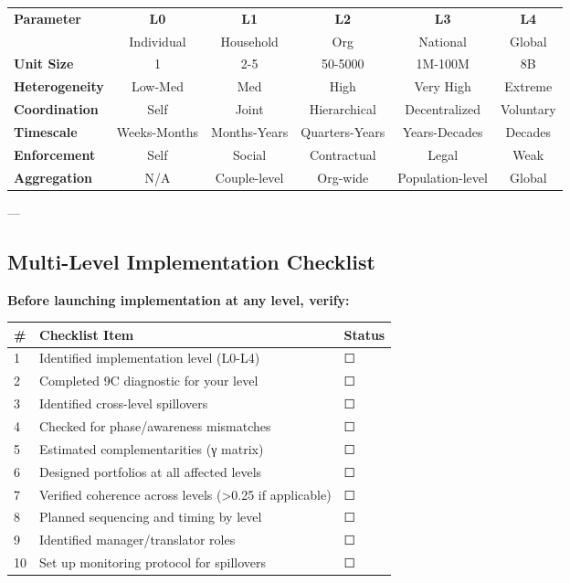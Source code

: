 \begin{center}
\small
\begin{tabular}{@{}p{1.5cm}|ccccc@{}}
\toprule
\textbf{Parameter} & \textbf{L0} & \textbf{L1} & \textbf{L2} & \textbf{L3} & \textbf{L4} \\
& Individual & Household & Org & National & Global \\
\midrule
\textbf{Unit Size} & 1 & 2-5 & 50-5000 & 1M-100M & 8B \\
\textbf{Heterogeneity} & Low-Med & Med & High & Very High & Extreme \\
\textbf{Coordination} & Self & Joint & Hierarchical & Decentralized & Voluntary \\
\textbf{Timescale} & Weeks-Months & Months-Years & Quarters-Years & Years-Decades & Decades \\
\textbf{Enforcement} & Self & Social & Contractual & Legal & Weak \\
\textbf{Aggregation} & N/A & Couple-level & Org-wide & Population-level & Global \\
\midrule
\end{tabular}
\end{center}

---


\subsection*{Multi-Level Implementation Checklist}

\textbf{Before launching implementation at any level, verify:}

\begin{center}
\small
\begin{tabular}{@{}p{0.5cm}p{7cm}p{1.5cm}@{}}
\toprule
\# & \textbf{Checklist Item} & \textbf{Status} \\
\midrule
1 & Identified implementation level (L0-L4) & ☐ \\
2 & Completed 9C diagnostic for your level & ☐ \\
3 & Identified cross-level spillovers & ☐ \\
4 & Checked for phase/awareness mismatches & ☐ \\
5 & Estimated complementarities (γ matrix) & ☐ \\
6 & Designed portfolios at all affected levels & ☐ \\
7 & Verified coherence across levels (>0.25 if applicable) & ☐ \\
8 & Planned sequencing and timing by level & ☐ \\
9 & Identified manager/translator roles & ☐ \\
10 & Set up monitoring protocol for spillovers & ☐ \\
\midrule
\end{tabular}
\end{center}

